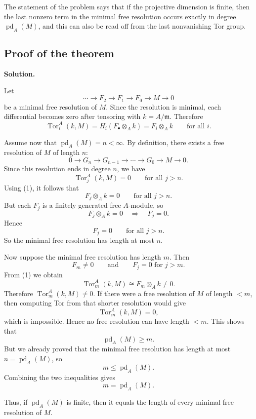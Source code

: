 \documentclass[12pt,a4paper]{article}
\theoremstyle{notespace}
\DeclareMathOperator{\Tor}{Tor}
\begin{document}
The statement of the problem says that if the projective dimension is finite, then the last nonzero term in the minimal free resolution occurs exactly in degree \(\operatorname{pd}_A(M)\), and this can also be read off from the last nonvanishing Tor group.

\subsection{Proof of the theorem}

\textbf{Solution.}

Let
\[
\cdots \longrightarrow F_2 \longrightarrow F_1 \longrightarrow F_0 \longrightarrow M \longrightarrow 0
\]
be a minimal free resolution of \(M\). Since the resolution is minimal, each differential becomes zero after tensoring with \(k=A/\mathfrak m\). Therefore
\[
\Tor_i^A(k,M)
=
H_i(F_\bullet \otimes_A k)
=
F_i \otimes_A k
\qquad \text{for all } i.
\tag{1}
\]

Assume now that \(\operatorname{pd}_A(M)=n<\infty\). By definition, there exists a free resolution of \(M\) of length \(n\):
\[
0 \longrightarrow G_n \longrightarrow G_{n-1} \longrightarrow \cdots \longrightarrow G_0 \longrightarrow M \longrightarrow 0.
\]
Since this resolution ends in degree \(n\), we have
\[
\Tor_j^A(k,M)=0
\qquad \text{for all } j>n.
\]
Using (1), it follows that
\[
F_j \otimes_A k = 0
\qquad \text{for all } j>n.
\]
But each \(F_j\) is a finitely generated free \(A\)-module, so
\[
F_j \otimes_A k = 0
\quad \Longrightarrow \quad
F_j=0.
\]
Hence
\[
F_j=0
\qquad \text{for all } j>n.
\]
So the minimal free resolution has length at most \(n\).

Now suppose the minimal free resolution has length \(m\). Then
\[
F_m \neq 0
\qquad \text{and} \qquad
F_j=0 \text{ for } j>m.
\]
From (1) we obtain
\[
\Tor_m^A(k,M)\cong F_m\otimes_A k \neq 0.
\]
Therefore \(\Tor_m^A(k,M)\neq 0\). If there were a free resolution of \(M\) of length \(<m\), then computing Tor from that shorter resolution would give
\[
\Tor_m^A(k,M)=0,
\]
which is impossible. Hence no free resolution can have length \(<m\). This shows that
\[
\operatorname{pd}_A(M)\ge m.
\]
But we already proved that the minimal free resolution has length at most \(n=\operatorname{pd}_A(M)\), so
\[
m\le \operatorname{pd}_A(M).
\]
Combining the two inequalities gives
\[
m=\operatorname{pd}_A(M).
\]

Thus, if \(\operatorname{pd}_A(M)\) is finite, then it equals the length of every minimal free resolution of \(M\).
\end{document}
